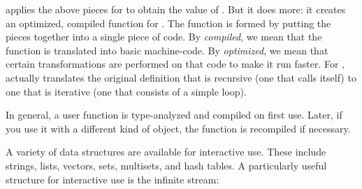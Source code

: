 %

\Language{} applies the above pieces for
 to obtain the value of .
But it does more:
it creates an optimized, compiled function for .
The function is formed by putting the pieces together into
a single piece of code.
By {\it compiled}, we mean that the function is translated into
basic machine-code.
By {\it optimized}, we mean that certain transformations are
performed on that code to make it run faster.
For , \Language{} actually translates the original definition
that is recursive (one that calls itself)
to one that is iterative (one that consists of a simple loop).

%

In general, a user function is type-analyzed and compiled on first use.
Later, if you use it with a different kind of object, the function
is recompiled if necessary.


A variety of data structures are available for interactive use.
These include strings, lists, vectors, sets, multisets, and hash
tables.
A particularly useful structure for interactive use is the
infinite stream:

%

